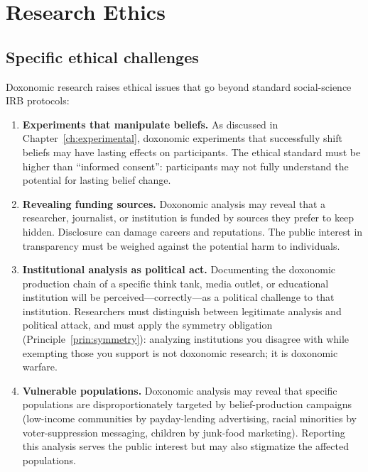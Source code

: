 \section{Research Ethics}
\label{sec:ch34-research}

\subsection{Specific ethical challenges}

Doxonomic research raises ethical issues that go beyond standard social-science IRB protocols:

\begin{enumerate}
  \item \textbf{Experiments that manipulate beliefs.}
  As discussed in Chapter~\ref{ch:experimental}, doxonomic experiments that successfully shift beliefs may have lasting effects on participants.
  The ethical standard must be higher than ``informed consent'': participants may not fully understand the potential for lasting belief change.

  \item \textbf{Revealing funding sources.}
  Doxonomic analysis may reveal that a researcher, journalist, or institution is funded by sources they prefer to keep hidden.
  Disclosure can damage careers and reputations.
  The public interest in transparency must be weighed against the potential harm to individuals.

  \item \textbf{Institutional analysis as political act.}
  Documenting the doxonomic production chain of a specific think tank, media outlet, or educational institution will be perceived---correctly---as a political challenge to that institution.
  Researchers must distinguish between legitimate analysis and political attack, and must apply the symmetry obligation (Principle~\ref{prin:symmetry}): analyzing institutions you disagree with while exempting those you support is not doxonomic research; it is doxonomic warfare.

  \item \textbf{Vulnerable populations.}
  Doxonomic analysis may reveal that specific populations are disproportionately targeted by belief-production campaigns (low-income communities by payday-lending advertising, racial minorities by voter-suppression messaging, children by junk-food marketing).
  Reporting this analysis serves the public interest but may also stigmatize the affected populations.
\end{enumerate}

